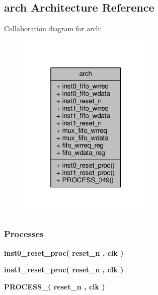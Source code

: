 \subsection{arch Architecture Reference}
\label{classrxiq_1_1arch}


Collaboration diagram for arch\+:\nopagebreak
\begin{figure}[H]
\begin{center}
\leavevmode
\includegraphics[width=184pt]{d9/d7a/classrxiq_1_1arch__coll__graph}
\end{center}
\end{figure}
\subsubsection*{Processes}
 \begin{DoxyCompactItemize}
\item 
{\bf inst0\+\_\+reset\+\_\+proc}{\bfseries  ( {\bfseries {\bfseries {\bf reset\+\_\+n}} \textcolor{vhdlchar}{ }} , {\bfseries {\bfseries {\bf clk}} \textcolor{vhdlchar}{ }} )}
\item 
{\bf inst1\+\_\+reset\+\_\+proc}{\bfseries  ( {\bfseries {\bfseries {\bf reset\+\_\+n}} \textcolor{vhdlchar}{ }} , {\bfseries {\bfseries {\bf clk}} \textcolor{vhdlchar}{ }} )}
\item 
{\bf P\+R\+O\+C\+E\+S\+S\+\_}{\bfseries  ( {\bfseries {\bfseries {\bf reset\+\_\+n}} \textcolor{vhdlchar}{ }} , {\bfseries {\bfseries {\bf clk}} \textcolor{vhdlchar}{ }} )}
\end{DoxyCompactItemize}
